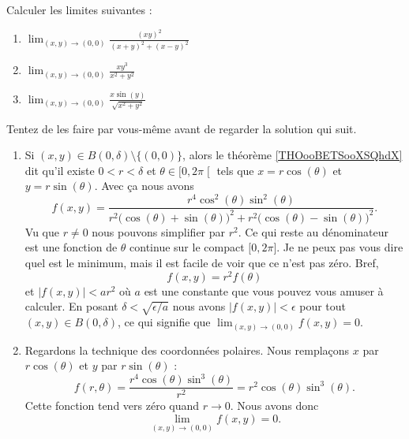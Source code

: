 \begin{example}     \label{EXooBEROooPhPsSU}
	Calculer les limites suivantes :
	\begin{enumerate}
		\item
		      \( \lim_{(x,y)\to(0,0)}\frac{ (xy)^2 }{ (x+y)^2+(x-y)^2 }\)
		\item
		      \( \lim_{(x,y)\to(0,0)}\frac{ xy^3 }{ x^2+y^2 }\)
		\item
		      \( \lim_{(x,y)\to(0,0)}\frac{ x\sin(y) }{ \sqrt{x^2+y^2} }\)
	\end{enumerate}

	Tentez de les faire par vous-même avant de regarder la solution qui suit.
	\begin{enumerate}
		\item
            Si \( (x,y)\in B(0,\delta)\setminus\{ (0,0) \}\), alors le théorème \ref{THOooBETSooXSQhdX} dit qu'il existe \( 0<r<\delta\) et \( \theta\in\mathopen[ 0 , 2\pi \mathclose[\) tels que \( x=r\cos(\theta)\) et \( y=r\sin(\theta)\). Avec ça nous avons
                    \begin{equation}
                        f(x,y)=\frac{ r^{4}\cos^2(\theta)\sin^2(\theta) }{ r^2\big( \cos(\theta)+\sin(\theta) \big)^2+r^2\big( \cos(\theta)-\sin(\theta) \big)^2}.
                    \end{equation}
                    Vu que \( r\neq 0\) nous pouvons simplifier par \( r^2\). Ce qui reste au dénominateur est une fonction de \( \theta\) continue sur le compact \( \mathopen[ 0 , 2\pi \mathclose] \). Je ne peux pas vous dire quel est le minimum, mais il est facile de voir que ce n'est pas zéro. Bref,
                    \begin{equation}
                        f(x,y)=r^2f(\theta)
                    \end{equation}
                    et \( | f(x,y) |<ar^2\) où \( a\) est une constante que vous pouvez vous amuser à calculer. En posant \( \delta<\sqrt{ \epsilon/a }\) nous avons \( | f(x,y) |<\epsilon\) pour tout \( (x,y)\in B(0,\delta)\), ce qui signifie que \( \lim_{(x,y)\to (0,0)} f(x,y)=0\).
		\item
		      Regardons la technique des coordonnées polaires. Nous remplaçons \( x\) par \( r\cos(\theta)\) et \( y\) par \( r\sin(\theta)\) :
		      \begin{equation}
			      f(r,\theta)=\frac{ r^4\cos(\theta)\sin^3(\theta) }{ r^2 }=r^2\cos(\theta)\sin^3(\theta).
		      \end{equation}
		      Cette fonction tend vers zéro quand \( r\to 0\). Nous avons donc
		      \begin{equation}
			      \lim_{(x,y)\to(0,0)}f(x,y)=0.
		      \end{equation}


\end{enumerate}
\end{example}
